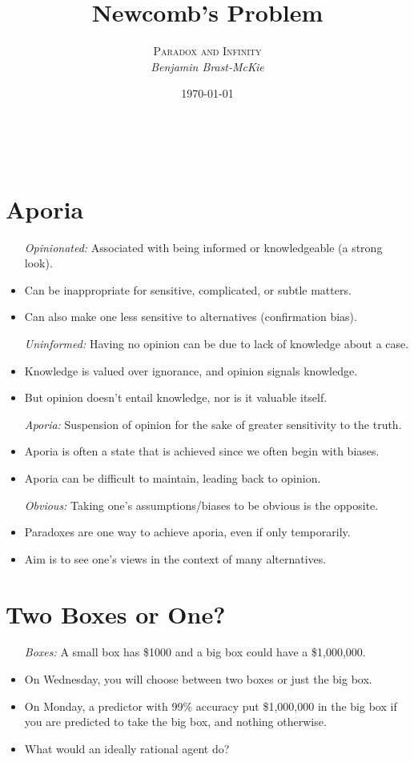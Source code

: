 \documentclass[a4paper, 11pt]{article} %
\title{\textbf{Newcomb's Problem}} %
\author{\textsc{Paradox and Infinity}\\ \em Benjamin Brast-McKie} %
\date{\today} %
\makeatletter
\renewcommand{\maketitle}{ %
\begin{flushright} %
{\LARGE\@title} %

\vspace{10pt} %

{\@author} %
\\\@date %

\vspace{10pt} %
\end{flushright}
}
\makeatother
\begin{document}
\maketitle %

\thispagestyle{empty}


\section*{Aporia}

\begin{itemize}
  \item[\it Opinionated:] Associated with being informed or knowledgeable (a strong look).
    \item Can be inappropriate for sensitive, complicated, or subtle matters.
    \item Can also make one less sensitive to alternatives (confirmation bias).
  \item[\it Uninformed:] Having no opinion can be due to lack of knowledge about a case.
    \item Knowledge is valued over ignorance, and opinion signals knowledge.
    \item But opinion doesn't entail knowledge, nor is it valuable itself.
  \item[\it Aporia:] Suspension of opinion for the sake of greater sensitivity to the truth.
    \item Aporia is often a state that is achieved since we often begin with biases.
    \item Aporia can be difficult to maintain, leading back to opinion.
  \item[\it Obvious:] Taking one's assumptions/biases to be obvious is the opposite.
    \item Paradoxes are one way to achieve aporia, even if only temporarily.
    \item Aim is to see one's views in the context of many alternatives.
\end{itemize}

\section*{Two Boxes or One?}

\begin{itemize}
  \item[\it Boxes:] A small box has \$1000 and a big box could have a \$1,000,000.
    \item On Wednesday, you will choose between two boxes or just the big box.
    \item On Monday, a predictor with 99\% accuracy put \$1,000,000 in the big box if you are predicted to take the big box, and nothing otherwise.
    \item What would an ideally rational agent do?
\end{itemize}
\end{document}
